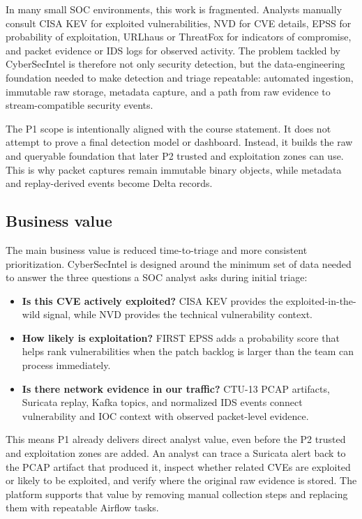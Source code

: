 \documentclass[11pt,a4paper]{article}
\begin{document}
In many small SOC environments, this work is fragmented. Analysts manually consult CISA KEV for exploited vulnerabilities, NVD for CVE details, EPSS for probability of exploitation, URLhaus or ThreatFox for indicators of compromise, and packet evidence or IDS logs for observed activity. The problem tackled by CyberSecIntel is therefore not only security detection, but the data-engineering foundation needed to make detection and triage repeatable: automated ingestion, immutable raw storage, metadata capture, and a path from raw evidence to stream-compatible security events.

The P1 scope is intentionally aligned with the course statement. It does not attempt to prove a final detection model or dashboard. Instead, it builds the raw and queryable foundation that later P2 trusted and exploitation zones can use. This is why packet captures remain immutable binary objects, while metadata and replay-derived events become Delta records.

\subsection{Business value}
The main business value is reduced time-to-triage and more consistent prioritization. CyberSecIntel is designed around the minimum set of data needed to answer the three questions a SOC analyst asks during initial triage:
\begin{itemize}
  \item \textbf{Is this CVE actively exploited?} CISA KEV provides the exploited-in-the-wild signal, while NVD provides the technical vulnerability context.
  \item \textbf{How likely is exploitation?} FIRST EPSS adds a probability score that helps rank vulnerabilities when the patch backlog is larger than the team can process immediately.
  \item \textbf{Is there network evidence in our traffic?} CTU-13 PCAP artifacts, Suricata replay, Kafka topics, and normalized IDS events connect vulnerability and IOC context with observed packet-level evidence.
\end{itemize}

This means P1 already delivers direct analyst value, even before the P2 trusted and exploitation zones are added. An analyst can trace a Suricata alert back to the PCAP artifact that produced it, inspect whether related CVEs are exploited or likely to be exploited, and verify where the original raw evidence is stored. The platform supports that value by removing manual collection steps and replacing them with repeatable Airflow tasks.
\end{document}
